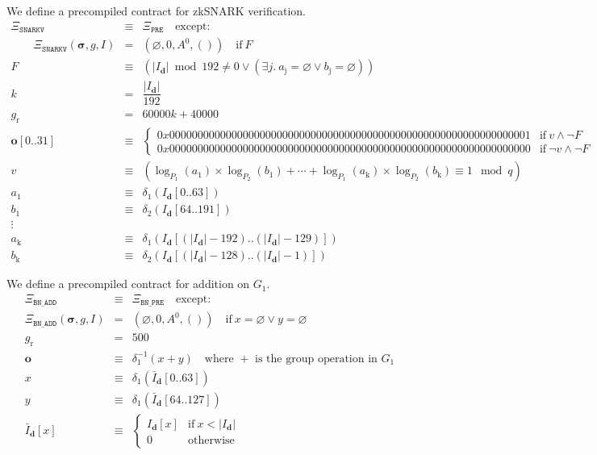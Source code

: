 \documentclass[9pt,oneside]{amsart}
\begin{document}
We define a precompiled contract for zkSNARK verification.
\begin{eqnarray}
\Xi_{\mathtt{SNARKV}}&\equiv&\Xi_{\mathtt{PRE}}\quad\text{except:}\\
\qquad\Xi_{\mathtt{SNARKV}}(\boldsymbol\sigma,g,I)&=&(\varnothing,0,A^0,())\quad\text{if}\ F\\
F&\equiv&(|I_{\mathbf{d}}|\bmod 192\neq 0\vee(\exists j.\ a_{\mathrm{j}}=\varnothing\vee b_{\mathrm{j}}=\varnothing))\\
k &=& \dfrac{|I_{\mathbf{d}}|}{192} \\
g_{\mathrm{r}}&=& 60000k + 40000 \\
\mathbf o[0..31]&\equiv&\begin{cases}
0x0000000000000000000000000000000000000000000000000000000000000001&\text{if}\ v\wedge\neg F\\
0x0000000000000000000000000000000000000000000000000000000000000000&\text{if}\ \neg v\wedge\neg F
\end{cases}\\
v&\equiv&(\log_{P_1}(a_1)\times\log_{P_2}(b_1)+\cdots+\log_{P_1}(a_{\mathrm{k}})\times\log_{P_2}(b_{\mathrm{k}})\equiv 1\mod q)\\
a_1&\equiv&\delta_1(I_{\mathbf d}[0..63])\\
b_1&\equiv&\delta_2(I_{\mathbf d}[64..191])\\\nonumber
\vdots\\
a_{\mathrm{k}}&\equiv&\delta_1(I_{\mathbf d}[(|I_{\mathbf d}|-192)..(|I_{\mathbf d}|-129)])\\
b_{\mathrm{k}}&\equiv&\delta_2(I_{\mathbf d}[(|I_{\mathbf d}|-128)..(|I_{\mathbf d}|-1)])
\end{eqnarray}

We define a precompiled contract for addition on $G_1$.
\begin{eqnarray}
\Xi_{\mathtt{BN\_ADD}}&\equiv&\Xi_{\mathtt{BN\_PRE}}\quad\text{except:}\\
\Xi_{\mathtt{BN\_ADD}}(\boldsymbol\sigma,g,I)&=&(\varnothing,0,A^0,())\quad\text{if}\ x=\varnothing\vee y=\varnothing\\
g_{\mathrm{r}} &=& 500\\
\mathbf o&\equiv&\delta_1^{-1}(x+y)\quad\text{where $+$ is the group operation in $G_1$}\\
x&\equiv&\delta_1(\bar I_{\mathbf d}[0..63])\\
y&\equiv&\delta_1(\bar I_{\mathbf d}[64..127])\\
\label{eq:complemented_input}\bar I_{\mathbf d}[x]&\equiv&\begin{cases}
I_{\mathbf d}[x]&\text{if}\ x < |I_{\mathbf d}|\\
0&\text{otherwise}
\end{cases}
\end{eqnarray}
\end{document}
